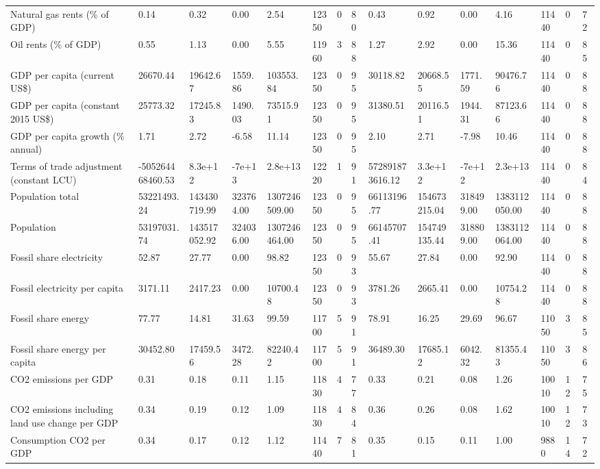 \begin{longtable}{lllllllllllllll}
\addlinespace
Natural gas rents (\% of GDP) & 0.14 & 0.32 & 0.00 & 2.54 & 12350 & 0 & 80 & 0.43 & 0.92 & 0.00 & 4.16 & 11440 & 0 & 72\\
Oil rents (\% of GDP) & 0.55 & 1.13 & 0.00 & 5.55 & 11960 & 3 & 88 & 1.27 & 2.92 & 0.00 & 15.36 & 11440 & 0 & 85\\
GDP per capita (current US\$) & 26670.44 & 19642.67 & 1559.86 & 103553.84 & 12350 & 0 & 95 & 30118.82 & 20668.55 & 1771.59 & 90476.76 & 11440 & 0 & 88\\
GDP per capita (constant 2015 US\$) & 25773.32 & 17245.83 & 1490.03 & 73515.91 & 12350 & 0 & 95 & 31380.51 & 20116.51 & 1944.31 & 87123.66 & 11440 & 0 & 88\\
GDP per capita growth (\% annual) & 1.71 & 2.72 & -6.58 & 11.14 & 12350 & 0 & 95 & 2.10 & 2.71 & -7.98 & 10.46 & 11440 & 0 & 88\\
\addlinespace
Terms of trade adjustment (constant LCU) & -505264468460.53 & 8.3e+12 & -7e+13 & 2.8e+13 & 12220 & 1 & 91 & 572891873616.12 & 3.3e+12 & -7e+12 & 2.3e+13 & 11440 & 0 & 84\\
Population total & 53221493.24 & 143430719.99 & 323764.00 & 1307246509.00 & 12350 & 0 & 95 & 66113196.77 & 154673215.04 & 318499.00 & 1383112050.00 & 11440 & 0 & 88\\
Population & 53197031.74 & 143517052.92 & 324036.00 & 1307246464.00 & 12350 & 0 & 95 & 66145707.41 & 154749135.44 & 318809.00 & 1383112064.00 & 11440 & 0 & 88\\
Fossil share electricity & 52.87 & 27.77 & 0.00 & 98.82 & 12350 & 0 & 93 & 55.67 & 27.84 & 0.00 & 92.90 & 11440 & 0 & 88\\
Fossil electricity per capita & 3171.11 & 2417.23 & 0.00 & 10700.48 & 12350 & 0 & 93 & 3781.26 & 2665.41 & 0.00 & 10754.28 & 11440 & 0 & 88\\
\addlinespace
Fossil share energy & 77.77 & 14.81 & 31.63 & 99.59 & 11700 & 5 & 91 & 78.91 & 16.25 & 29.69 & 96.67 & 11050 & 3 & 85\\
Fossil share energy per capita & 30452.80 & 17459.56 & 3472.28 & 82240.42 & 11700 & 5 & 91 & 36489.30 & 17685.12 & 6042.32 & 81355.43 & 11050 & 3 & 86\\
CO2 emissions per GDP & 0.31 & 0.18 & 0.11 & 1.15 & 11830 & 4 & 77 & 0.33 & 0.21 & 0.08 & 1.26 & 10010 & 12 & 75\\
CO2 emissions including land use change per GDP & 0.34 & 0.19 & 0.12 & 1.09 & 11830 & 4 & 84 & 0.36 & 0.26 & 0.08 & 1.62 & 10010 & 12 & 73\\
Consumption CO2 per GDP & 0.34 & 0.17 & 0.12 & 1.12 & 11440 & 7 & 81 & 0.35 & 0.15 & 0.11 & 1.00 & 9880 & 14 & 72\\

\end{longtable}
